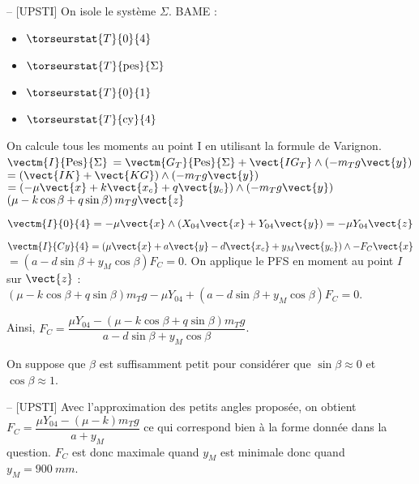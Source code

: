 \ifprof
\begin{corrige}-- [UPSTI]
On isole le système ${\Sigma}$.
BAME :
\begin{itemize}
\item $\torseurstat{T}{0}{4}$
\item $\torseurstat{T}{\text{pes}}{\Sigma}$
\item $\torseurstat{T}{0}{1}$
\item $\torseurstat{T}{\text{cy}}{4}$
\end{itemize}

On calcule tous les moments au point I en utilisant la formule de Varignon.
$\vectm{I}{\text{Pes}}{\Sigma} $
$= \vectm{G_T}{\text{Pes}}{\Sigma} + \vect{IG_T}\wedge \left(-m_T g\vect{y}\right)$
$=\left(\vect{IK}+\vect{KG}\right) \wedge \left(-m_T g\vect{y}\right)$
$ = \left(-\mu \vect{x} + k\vect{x_c}+q\vect{y_c}\right) \wedge \left(-m_T g\vect{y}\right)$
$\left(\mu -k\cos\beta+q\sin\beta \right) m_T g\vect{z}$

$\vectm{I}{0}{4} = -\mu \vect{x} \wedge \left(X_{04}\vect{x}+Y_{04}\vect{y}\right) =-\mu Y_{04}\vect{z}$

$\vectm{I}{Cy}{4} =\left(\mu \vect{x} + a\vect{y} - d\vect{x_c} +y_M \vect{y_c}\right) \wedge -F_C\vect{x}$
$=(a-d\sin\beta +y_M \cos\beta) F_C = 0$.
On applique le PFS en moment au point $I$ sur $\vect{z}$ : 
$\left(\mu -k\cos\beta+q\sin\beta \right) m_T g - \mu Y_{04}+\left(a-d\sin\beta +y_M \cos\beta\right) F_C = 0$.

Ainsi, $F_C=\dfrac{\mu Y_{04}-(\mu -k\cos\beta +q\sin\beta) m_T g}{a-d\sin\beta+y_M \cos\beta}$.

\end{corrige}
\else
\fi

On suppose que \(\beta\) est suffisamment petit pour considérer que \(\sin \beta \approx 0\) et \(\cos \beta \approx 1\).\\


\ifprof
\begin{corrige}-- [UPSTI]
Avec l’approximation des petits angles proposée, on obtient $F_C= \dfrac{\mu Y_{04}-(\mu -k) m_T g}{a+y_M}$ ce qui correspond bien à la forme donnée dans la question.
$F_C$ est donc maximale quand $y_M$ est minimale donc quand $y_M=\SI{900}{mm}$.
\end{corrige}
\else
\fi

